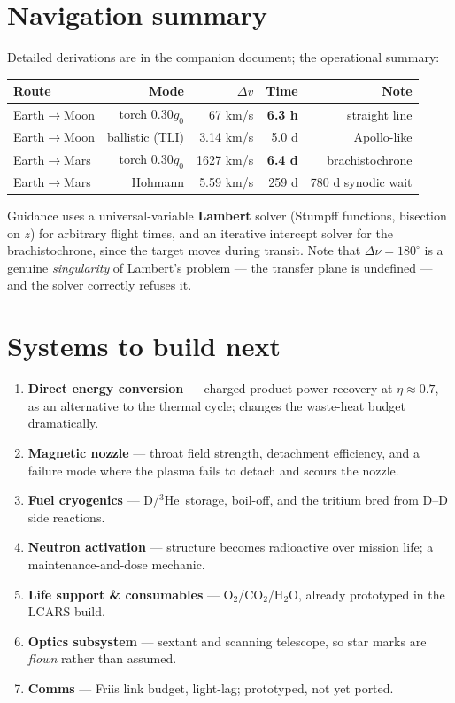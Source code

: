 \documentclass[11pt]{article}
\newcommand{\gz}{g_0}
\newcommand{\he}{\ensuremath{{}^3\mathrm{He}}}
\begin{document}
\section{Navigation summary}
Detailed derivations are in the companion document; the operational summary:
\begin{center}\small
\begin{tabular}{@{}lrrrr@{}}
\toprule
Route & Mode & $\Delta v$ & Time & Note\\
\midrule
Earth$\to$Moon & torch $0.30\gz$ & 67 km/s & \textbf{6.3 h} & straight line\\
Earth$\to$Moon & ballistic (TLI) & 3.14 km/s & 5.0 d & Apollo-like\\
Earth$\to$Mars & torch $0.30\gz$ & 1627 km/s & \textbf{6.4 d} & brachistochrone\\
Earth$\to$Mars & Hohmann & 5.59 km/s & 259 d & 780 d synodic wait\\
\bottomrule
\end{tabular}
\end{center}
Guidance uses a universal-variable \textbf{Lambert} solver (Stumpff functions, bisection on $z$) for arbitrary flight times, and an iterative intercept solver for the brachistochrone, since the target moves during transit. Note that $\Delta\nu=180^\circ$ is a genuine \emph{singularity} of Lambert's problem --- the transfer plane is undefined --- and the solver correctly refuses it.

\section{Systems to build next}
\begin{enumerate}\itemsep2pt
\item \textbf{Direct energy conversion} --- charged-product power recovery at $\eta\approx0.7$, as an alternative to the thermal cycle; changes the waste-heat budget dramatically.
\item \textbf{Magnetic nozzle} --- throat field strength, detachment efficiency, and a failure mode where the plasma fails to detach and scours the nozzle.
\item \textbf{Fuel cryogenics} --- D/\he\ storage, boil-off, and the tritium bred from D--D side reactions.
\item \textbf{Neutron activation} --- structure becomes radioactive over mission life; a maintenance-and-dose mechanic.
\item \textbf{Life support \& consumables} --- O$_2$/CO$_2$/H$_2$O, already prototyped in the LCARS build.
\item \textbf{Optics subsystem} --- sextant and scanning telescope, so star marks are \emph{flown} rather than assumed.
\item \textbf{Comms} --- Friis link budget, light-lag; prototyped, not yet ported.
\end{enumerate}
\end{document}
